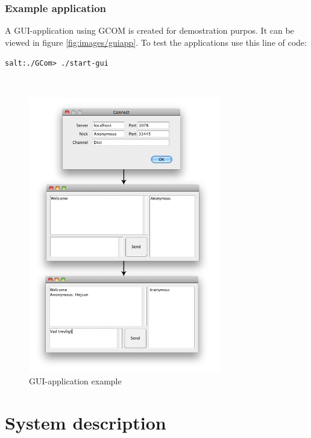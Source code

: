 \documentclass[titlepage, twocolumn, a4paper, 10pt]{article}
\begin{document}
\subsubsection{Example application}\label{sec:exapp}
A GUI-application using GCOM is created for demostration purpos. 
It can be viewed in figure \vref{fig:images/guiapp}. To test the 
applications use this line of code:
\\
\begin{footnotesize}
  \verb!salt:./GCom> ./start-gui!
\end{footnotesize}\\

\begin{figure}[!thb]
  \centering
  \includegraphics[width=3.3in]{images/TestProgram.png}
  \caption{GUI-application example }
  \label{fig:images/guiapp}
\end{figure}



\section{System description}\label{sec:system}

\end{document}
